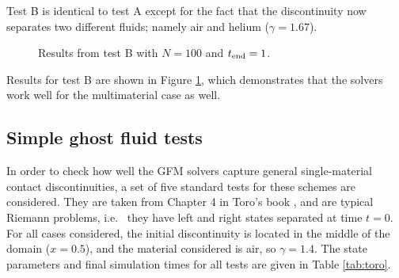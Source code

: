 \documentclass[final,3p,twocolumn]{elsarticle}
\begin{document}
Test B is identical to test A except for the fact that the discontinuity now
separates two different fluids; namely air and helium ($\gamma=1.67$). 


\begin{figure}[htb]
    \centering
    \caption[caption]
    {
        Results from test B with $N=100$ and $t_{\rm end}=1$. 
    }
    \label{fig:testB}
\end{figure}

Results for test B are shown in Figure \ref{fig:testB}, which demonstrates that
the solvers work well for the multimaterial case as well. 

\subsection{Simple ghost fluid tests}
\label{subsec:toro}

In order to check how well the GFM solvers capture general single-material
contact discontinuities, a set of five standard tests for these schemes are
considered. They are taken from Chapter 4 in Toro's book
\cite{toro2013riemann}, and are typical Riemann problems, i.e.~ they have left
and right states separated at time $t=0$. For all cases considered, the initial
discontinuity is located in the middle of the domain ($x=0.5$), and the
material considered is air, so $\gamma=1.4$.  The state parameters and final
simulation times for all tests are given in Table \ref{tab:toro}.
\end{document}

